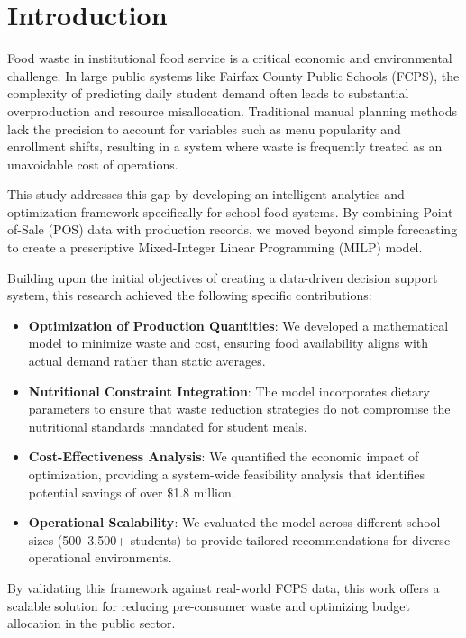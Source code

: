 \documentclass{scrartcl}
\begin{document}
\section{Introduction}

 Food waste in institutional food service is a critical economic and environmental challenge. In large public systems like Fairfax County Public Schools (FCPS), the complexity of predicting daily student demand often leads to substantial overproduction and resource misallocation. Traditional manual planning methods lack the precision to account for variables such as menu popularity and enrollment shifts, resulting in a system where waste is frequently treated as an unavoidable cost of operations.

This study addresses this gap by developing an intelligent analytics and optimization framework specifically for school food systems. By combining Point-of-Sale (POS) data with production records, we moved beyond simple forecasting to create a prescriptive Mixed-Integer Linear Programming (MILP) model.

Building upon the initial objectives of creating a data-driven decision support system, this research achieved the following specific contributions:

\begin{itemize}

    \item \textbf{Optimization of Production Quantities}: We developed a mathematical model to minimize waste and cost, ensuring food availability aligns with actual demand rather than static averages.

    \item \textbf{Nutritional Constraint Integration}: The model incorporates dietary parameters to ensure that waste reduction strategies do not compromise the nutritional standards mandated for student meals.

    \item \textbf{Cost-Effectiveness Analysis}: We quantified the economic impact of optimization, providing a system-wide feasibility analysis that identifies potential savings of over \$1.8 million.

    \item \textbf{Operational Scalability}: We evaluated the model across different school sizes (500–3,500+ students) to provide tailored recommendations for diverse operational environments.
\end{itemize}

By validating this framework against real-world FCPS data, this work offers a scalable solution for reducing pre-consumer waste and optimizing budget allocation in the public sector.
\end{document}
